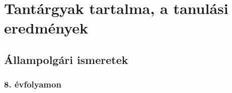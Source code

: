 \hypertarget{tantargyak-tartalma-a-tanulasi-eredmenyek}{%
\section{Tantárgyak tartalma, a tanulási
eredmények}\label{tantargyak-tartalma-a-tanulasi-eredmenyek}}

\hypertarget{allampolgari-ismeretek}{%
\subsection{Állampolgári ismeretek}\label{allampolgari-ismeretek}}

\hypertarget{evfolyamon}{%
\subsubsection{8. évfolyamon}\label{evfolyamon}}

